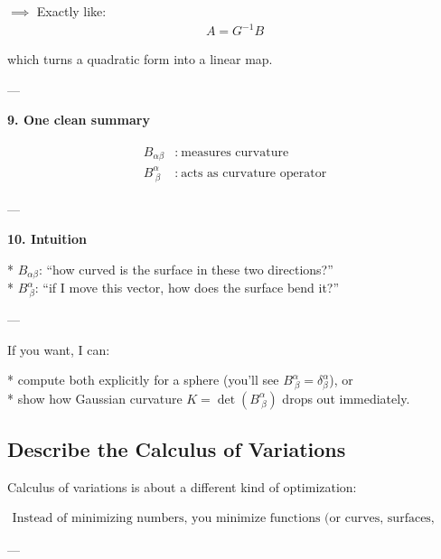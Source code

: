 \documentclass[12pt,a4paper]{report}
\begin{document}
\begin{description}
\begin{description}
$\implies$ Exactly like:
\begin{align*}
A = G^{-1}B
\end{align*}

which turns a quadratic form into a linear map.

---

\item \textbf{9. One clean summary}

\begin{align*}
\boxed{
\begin{aligned}
B_{\alpha\beta} &:\ \text{measures curvature} \\
B^\alpha_{\ \beta} &:\ \text{acts as curvature operator}
\end{aligned}
}
\end{align*}

---

\item \textbf{10. Intuition}

* $B_{\alpha\beta}$: “how curved is the surface in these two directions?” \\
* $B^\alpha_{\ \beta}$: “if I move this vector, how does the surface bend it?”

---
\end{description}

If you want, I can:

* compute both explicitly for a sphere (you’ll see $B^\alpha_{\ \beta} = \delta^\alpha_\beta$), or \\
* show how Gaussian curvature $K = \det(B^\alpha_{\ \beta})$ drops out immediately.

\end{description}

\HLINE
\newpage
\subsection*{Describe the Calculus of Variations}

Calculus of variations is about a different kind of optimization:

\begin{align*}
\boxed{
\text{Instead of minimizing numbers, you minimize functions (or curves, surfaces, fields).}
}
\end{align*}

---
\end{document}
